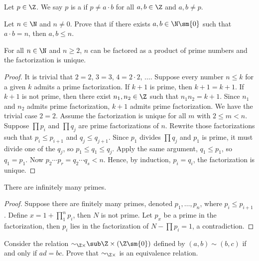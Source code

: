 \documentclass[10pt]{article}
\begin{document}
\begin{definition}
    Let $p\in\Z$. We say $p$ is a  if $p\ne a\cdot b$ for all $a,b\in\Z$ and $a,b\ne p$.
\end{definition}
\begin{problem}
    Let $n\in\N$ and $n\ne 0$. Prove that if there exists $a,b\in\N\sm\{0\}$ such that $a\cdot b=n$, then $a,b\le n$.
\end{problem}
\begin{theorem}
    For all $n\in\N$ and $n\ge 2$, $n$ can be factored as a product of prime numbers and the factorization is unique.
\end{theorem}
\begin{proof}
    It is trivial that $2=2$, $3=3$, $4=2\cdot 2$, $\dots$. Suppose every number $n\le k$ for a given $k$ admits a prime factorization. If $k+1$ is prime, then $k+1=k+1$. If $k+1$ is not prime, then there exist ${n}_{1},{n}_{2}\in\Z$ such that ${n}_{1}{n}_{2}=k+1$. Since ${n}_{1}$ and ${n}_{2}$ admits prime factorization, $k+1$ admits prime factorization. We have the trivial case $2=2$. Assume the factorization is unique for all $m$ with $2\le m<n$. Suppose $\prod{p}_{i}$ and $\prod{q}_{j}$ are prime factorizations of $n$. Rewrite those factorizations such that ${p}_{i}\le{p}_{i+1}$ and ${q}_{j}\le{q}_{j+1}$. Since ${p}_{1}$ divides $\prod{q}_{j}$ and ${p}_{1}$ is prime, it must divide one of the ${q}_{j}$, so ${p}_{1}\le{q}_{1}\le{q}_{j}$. Apply the same argument, ${q}_{1}\le{p}_{1}$, so ${q}_{1}={p}_{1}$. Now ${p}_{2}\cdots{p}_{r}={q}_{2}\cdots{q}_{s}<n$. Hence, by induction, ${p}_{i}={q}_{i}$, the factorization is unique.
\end{proof}
\begin{theorem}
    There are infinitely many primes.
\end{theorem}
\begin{proof}
    Suppose there are finitely many primes, denoted ${p}_{1},\dots,{p}_{n}$, where ${p}_{i}\le{p}_{i+1}$. Define $x=1+{\prod}_{1}^{n}{p}_{i}$, then $N$ is not prime. Let ${p}_{x}$ be a prime in the factorization, then ${p}_{i}$ lies in the factorization of $N-{\prod}{p}_{i}=1$, a contradiction.
\end{proof}
\begin{problem}
    Consider the relation ${\sim}_{\Z\times}\sub\Z\times(\Z\sm\{0\})$ defined by $(a,b)\sim(b,c)$ if and only if $ad=bc$. Prove that ${\sim}_{\Z\times}$ is an equivalence relation.
\end{problem}
\end{document}
